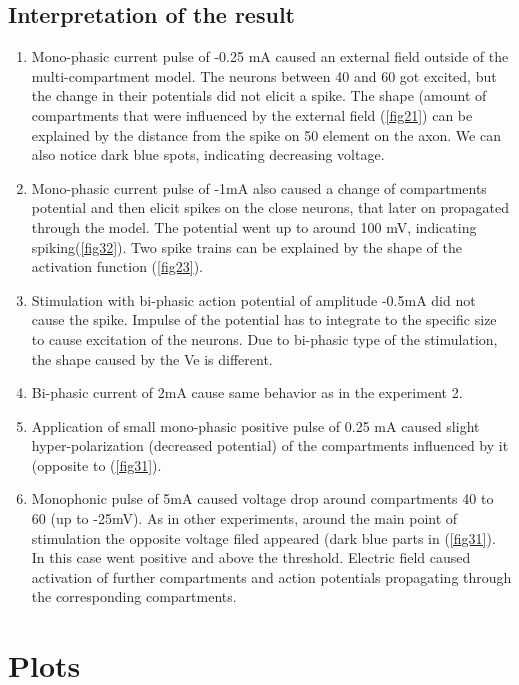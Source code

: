 \documentclass{scrartcl}			%
\begin{document}
\subsection{Interpretation of the result}
\begin{enumerate}
\item Mono-phasic current pulse of -0.25 mA caused an external field outside of the multi-compartment model. The neurons between 40 and 60 got excited, but the change in their potentials did not elicit a spike. The shape (amount of compartments that were influenced by the external field (\ref{fig21}) can be explained by the distance from the spike on 50 element on the axon. We can also notice dark blue spots, indicating decreasing voltage.
\item Mono-phasic current pulse of -1mA also caused a change of compartments potential and then elicit spikes on the close neurons, that later on propagated through the model. The potential went up to around 100 mV, indicating spiking(\ref{fig32}). Two spike trains can be explained by the shape of the activation function (\ref{fig23}).
\item Stimulation with bi-phasic action potential of amplitude -0.5mA did not cause the spike. Impulse of the potential has to integrate to the specific size to cause excitation of the neurons. Due to bi-phasic type of the stimulation, the shape caused by the Ve is different.
\item Bi-phasic current of 2mA cause same behavior as in the experiment 2.
\item Application of small mono-phasic positive pulse of 0.25 mA caused slight hyper-polarization (decreased potential) of the compartments influenced by it (opposite to (\ref{fig31}).
\item Monophonic pulse of 5mA caused voltage drop around compartments 40 to 60 (up to -25mV). 
As in other experiments, around the main point of stimulation the opposite voltage filed appeared (dark blue parts in (\ref{fig31}). In this case went positive and above the threshold. Electric field caused activation of further compartments and action potentials propagating through the corresponding compartments.
\end{enumerate}
\newpage
\section{Plots}
\end{document}
